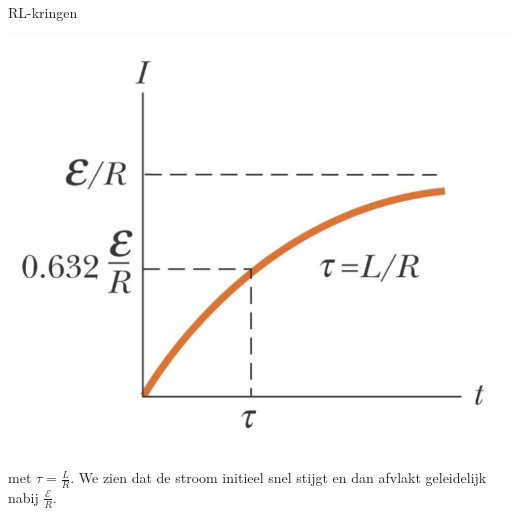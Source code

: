 \begin{app}[RL-kringen]{RL-kringen}
\begin{minipage}{.3\textwidth}
        \includegraphics[scale = 0.35]{Images/Magnetisme/RLKringGraph.png}
    \end{minipage}

    \noindent met $\tau = \tfrac{L}{R}$. We zien dat de stroom initieel snel stijgt en dan afvlakt geleidelijk nabij $\tfrac{\mathcal{E}}{R}$.
\end{app}

\newpage

